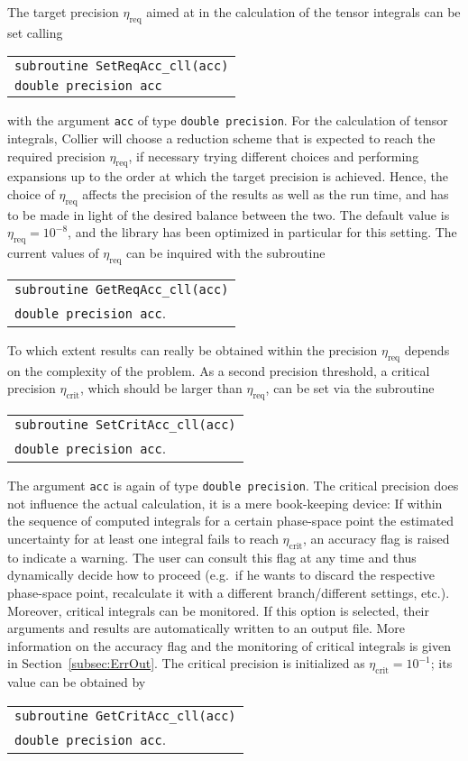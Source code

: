 \documentclass[preprint,sort&compress,12pt]{elsarticle}
\makeatletter
\def\bce{\begin{center}}
\def\ece{\end{center}}
\def\refse#1{\mbox{Section~\ref{#1}}}
\def\eg{e.g.\ }
\newcommand{\collier}{{\sc Collier}}
\newlength{\parwidth}\newlength{\colonewidth}%
\newcommand{\cpcsub}[1]
{%
\setlength{\parwidth}{\textwidth}\addtolength{\parwidth}{-2.1em}%
\bce
\begin{tabular}[t]{@{}p{\parwidth}@{}}
#1
\end{tabular}
\ece
}%
\makeatother
\begin{document}
The target precision $\eta_\textrm{req}$ 
aimed at in the calculation of the tensor integrals can be set calling
\cpcsub{
{\tt subroutine  SetReqAcc\_cll(acc)}\\
{\tt double precision acc} \\
}
with the argument {\tt acc} of type {\tt double precision}. For the
calculation of tensor integrals, {\collier} will choose a reduction
scheme
that is expected to reach the required precision $\eta_\textrm{req}$, if necessary trying 
different choices and performing expansions 
up to the order at which the target precision is achieved.
Hence, the choice of $\eta_\textrm{req}$ affects the precision of the results as well as the run time,
and has to be made in light of the desired balance between the two. 
The default value is $\eta_\textrm{req}=10^{-8}$, and the library has been optimized in particular for this setting. 
The current values of
$\eta_\textrm{req}$ can be inquired with the subroutine
\cpcsub{
{\tt subroutine  GetReqAcc\_cll(acc)} \\
{\tt double precision acc}\;. \\
}
To which extent results
can really be obtained within the precision $\eta_\textrm{req}$ 
depends on the complexity of the problem.
As a second precision threshold, a critical precision
$\eta_\textrm{crit}$, which should be larger than $\eta_\textrm{req}$, 
can be set via the subroutine
\cpcsub{
{\tt subroutine  SetCritAcc\_cll(acc)}\\
{\tt double precision acc}\;. \\
}
The argument {\tt acc} is again of type {\tt double precision}. The critical precision does not influence the actual calculation,
it is a mere book-keeping device: 
If within the sequence of computed integrals for a certain phase-space
point the estimated uncertainty for at least one integral fails to
reach $\eta_\textrm{crit}$, an accuracy flag is
raised to indicate a warning.  The user can consult this flag
at any time and thus dynamically decide how to proceed (\eg if
he wants to discard the respective phase-space point,
 recalculate it with a different branch/different settings, etc.). 
Moreover, critical integrals can be monitored. If this option is selected, their arguments and results are automatically written to an output file. 
More information on the accuracy
flag and the monitoring of critical integrals is given in \refse{subsec:ErrOut}.
The critical precision is initialized as $\eta_\textrm{crit}=10^{-1}$; 
its value can be obtained by  
\cpcsub{
{\tt subroutine  GetCritAcc\_cll(acc)}\\
{\tt double precision acc}\;. \\
}
\end{document}
